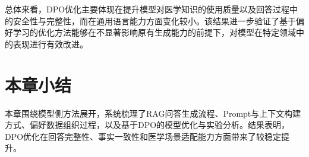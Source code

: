 总体来看，DPO优化主要体现在提升模型对医学知识的使用质量以及回答过程中的安全性与完整性，而在通用语言能力方面变化较小。该结果进一步验证了基于偏好学习的优化方法能够在不显著影响原有生成能力的前提下，对模型在特定领域中的表现进行有效改进。





\section{本章小结}

本章围绕模型侧方法展开，系统梳理了RAG问答生成流程、Prompt与上下文构建方式、偏好数据组织过程，以及基于DPO的模型优化与实验分析。结果表明，DPO优化在回答完整性、事实一致性和医学场景适配能力方面带来了较稳定提升。
